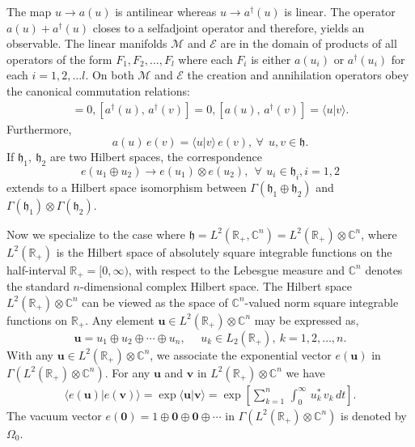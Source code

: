 The map $u\rightarrow a(u)$ is antilinear whereas  $u\rightarrow a^\dag({u})$ is linear.  The operator $a(u)+a^\dag(u)$ closes to a selfadjoint operator and therefore, yields an observable. The linear manifolds $\mathcal{M}$ and $\mathcal{E}$ are in the domain of products of all operators of the form $F_1, F_2, \ldots, F_l$ where each $F_i$ is either $a(u_i)$ or $a^\dag(u_i)$ for each $i=1,2,\ldots l$. On both 
$\mathcal{M}$ and $\mathcal{E}$ the creation and annihilation operators obey the canonical commutation relations: 
\begin{eqnarray}
 [a(u),\, a(v)]= 0,  [a^\dag(u),\, a^\dag(v)] = 0, [a(u),\, a^\dag(v)] = \langle u\vert v\rangle. \label{chap8-eq3.4}
\end{eqnarray} 
Furthermore, 
\begin{equation}
a(u)\, e(v)=\langle u\vert v\rangle\, e(v), \ \forall\ \ u, v\in \mathfrak{h}. \label{chap8-eq3.5}
\end{equation}
If $\mathfrak{h}_1,\ \mathfrak{h}_2$ are two Hilbert spaces,  the correspondence 
\begin{equation}
e(u_1\oplus u_2)\rightarrow e(u_1)\otimes e(u_2), \ \ \forall\ \, u_i\in\mathfrak{h}_i, i=1,2\label{chap8-eq3.6}
\end{equation} 
extends to a Hilbert space isomorphism between $\Gamma(\mathfrak{h}_1\oplus\mathfrak{h}_2)$ and $\Gamma(\mathfrak{h}_1)\otimes\Gamma(\mathfrak{h}_2)$. 

Now we specialize to the case where $\mathfrak{h}=L^2(\mathbb{R}_+,\mathbb{C}^n)=L^2(\mathbb{R}_+)\otimes \mathbb{C}^n$, where $L^2(\mathbb{R}_+)$ is the  Hilbert space of absolutely square integrable functions on the half-interval $\mathbb{R}_+=[0,\infty)$, with respect to the Lebesgue measure  and  $\mathbb{C}^n$  denotes the standard $n$-dimensional complex Hilbert space.  The Hilbert space $L^2(\mathbb{R}_+)\otimes \mathbb{C}^n$ can be viewed as the space of $\mathbb{C}^n$-valued norm square integrable functions on $\mathbb{R}_{+}$. 
Any element $\mathbf{u}\in L^2(\mathbb{R}_+) \otimes \mathbb{C}^n$ may be expressed as,  
$$
\mathbf{u}= u_1\oplus u_2\oplus \cdots \oplus u_n,\ \ \ \ \ \ u_k\in L_2(\mathbb{R}_+),\  k=1,2,\ldots, n.
$$
With any $\mathbf{u}\in L^2(\mathbb{R}_+)\otimes \mathbb{C}^n$, we associate the exponential vector $e(\mathbf{u})$ in 
$\Gamma(L^2(\mathbb{R}_+)\otimes \mathbb{C}^n)$. For any $\mathbf{u}$ and $\mathbf{v}$ in $L^2(\mathbb{R}_+)\otimes \mathbb{C}^n$ we have 
\begin{eqnarray}
\langle e(\mathbf{u})\vert e(\mathbf{v})\rangle={\exp}\langle \mathbf{u}\vert \mathbf{v}\rangle 
={\exp}\left[\sum_{k=1}^n\,\int_0^\infty\,  u_k^*\, v_k\, dt\right]. \label{chap8-eq3.7}
\end{eqnarray}
The vacuum vector $e(\mathbf{\mathbf{0}}) =   1 \oplus \mathbf{0} \oplus \mathbf{0} \oplus \cdots$ in  $\Gamma(L^2(\mathbb{R}_+)\otimes \mathbb{C}^n)$ is denoted by 
$\Omega_0$.  

